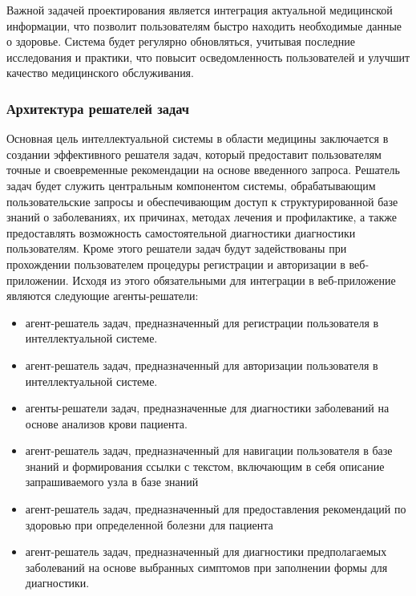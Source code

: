 Важной задачей проектирования является интеграция актуальной медицинской информации, что позволит пользователям быстро находить необходимые данные о здоровье. Система будет регулярно обновляться, учитывая последние исследования и практики, что повысит осведомленность пользователей и улучшит качество медицинского обслуживания.


\subsubsection{Архитектура решателей задач}

Основная цель интеллектуальной системы в области медицины заключается в создании эффективного решателя задач, который предоставит пользователям точные и своевременные рекомендации на основе введенного запроса. Решатель задач будет служить центральным компонентом системы, обрабатывающим пользовательские запросы и обеспечивающим доступ к структурированной базе знаний о заболеваниях, их причинах, методах лечения и профилактике, а также предоставлять возможность самостоятельной диагностики диагностики пользователям. Кроме этого решатели задач будут задействованы при прохождении пользователем процедуры регистрации и авторизации в веб-приложении. Исходя из этого обязательными для интеграции в веб-приложение являются следующие агенты-решатели:
\begin{itemize}
    \item агент-решатель задач, предназначенный для регистрации пользователя в интеллектуальной системе.
    \item агент-решатель задач, предназначенный для авторизации пользователя в интеллектуальной системе.
    \item агенты-решатели задач, предназначенные для диагностики заболеваний на основе анализов крови пациента.
    \item агент-решатель задач, предназначенный для навигации пользователя в базе знаний и формирования ссылки с текстом, включающим в себя описание запрашиваемого узла в базе знаний
    \item агент-решатель задач, предназначенный для предоставления рекомендаций по здоровью при определенной болезни для пациента
    \item агент-решатель задач, предназначенный для диагностики предполагаемых заболеваний на основе выбранных симптомов при заполнении формы для диагностики.
\end{itemize}



